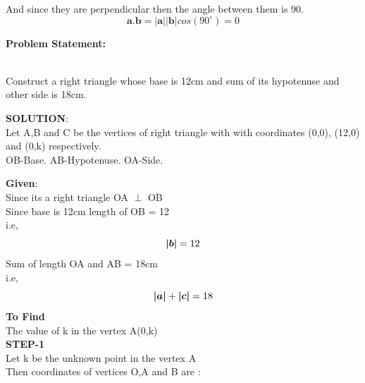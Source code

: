 \documentclass[10pt,a4paper]{report}
\begin{document}
\begin{multicols}{2}
\raggedright And since they are perpendicular then the angle between them is 90.\\
\vspace{2mm}
\begin{equation}
\boldsymbol{a}.\boldsymbol{b}=\boldsymbol{|a|}\boldsymbol{|b|}cos(90^{\circ})=0
\end{equation}
\raggedright \textbf{Problem Statement:}\vspace{2mm}
\raggedright \\Construct a right triangle whose base is 12cm and sum of its hypotenuse and other side is 18cm.
\vspace{5mm}

\raggedright \textbf{SOLUTION}:\vspace{2mm}\\
Let A,B and C be the vertices of right triangle with with coordinates (0,0), (12,0) and (0,k) respectively.\vspace{2mm}\\
OB-Base.
AB-Hypotenuse.
OA-Side.\\\vspace{2mm}
\raggedright \textbf{Given}:\vspace{2mm}\\
Since its a right triangle OA $\perp$ OB \\\vspace{2mm}
Since base is 12cm length of OB = 12  \\i.e,\\
\begin{equation}
\boldsymbol{|b|}= 12 \vspace{2mm}
\end{equation}
Sum of length OA and AB = 18cm \\ i.e,\\
\begin{equation}
\boldsymbol{|a|} + \boldsymbol{|c|}= 18 \vspace{2mm}
\end{equation}
\textbf{To Find}\vspace{2mm}\\
The value of k in the vertex A(0,k)\\\vspace{2mm}
\textbf{STEP-1}\vspace{2mm}\\
Let k be the unknown point in the vertex A \vspace{2mm}\\
Then coordinates of vertices  O,A and B are :\vspace{2mm}\\


\end{multicols}
\end{document}
